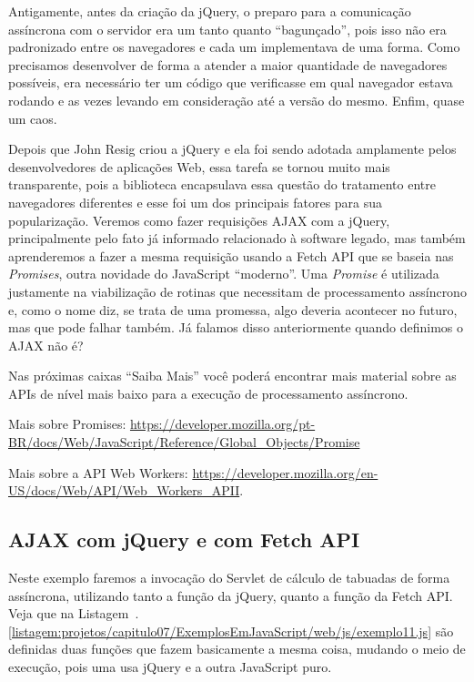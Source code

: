 Antigamente, antes da criação da jQuery, o preparo para a comunicação assíncrona com o servidor era um tanto quanto ``bagunçado'', pois isso não era padronizado entre os navegadores e cada um implementava de uma forma. Como precisamos desenvolver de forma a atender a maior quantidade de navegadores possíveis, era necessário ter um código que verificasse em qual navegador estava rodando e as vezes levando em consideração até a versão do mesmo. Enfim, quase um caos.

Depois que John Resig criou a jQuery e ela foi sendo adotada amplamente pelos desenvolvedores de aplicações Web, essa tarefa se tornou muito mais transparente, pois a biblioteca encapsulava essa questão do tratamento entre navegadores diferentes e esse foi um dos principais fatores para sua popularização. Veremos como fazer requisições AJAX com a jQuery, principalmente pelo fato já informado relacionado à software legado, mas também aprenderemos a fazer a mesma requisição usando a Fetch API que se baseia nas \textit{Promises}, outra novidade do JavaScript ``moderno''. Uma \textit{Promise} é utilizada justamente na viabilização de rotinas que necessitam de processamento assíncrono e, como o nome diz, se trata de uma promessa, algo deveria acontecer no futuro, mas que pode falhar também. Já falamos disso anteriormente quando definimos o AJAX não é?

Nas próximas caixas ``Saiba Mais'' você poderá encontrar mais material sobre as APIs de nível mais baixo para a execução de processamento assíncrono.

\begin{saibaMais}
    Mais sobre Promises: \url{https://developer.mozilla.org/pt-BR/docs/Web/JavaScript/Reference/Global_Objects/Promise}
\end{saibaMais}

\begin{saibaMais}
    Mais sobre a API Web Workers: \url{https://developer.mozilla.org/en-US/docs/Web/API/Web_Workers_APII}.
\end{saibaMais}



\subsection{AJAX com jQuery e com Fetch API}

Neste exemplo faremos a invocação do Servlet de cálculo de tabuadas de forma assíncrona, utilizando tanto a função  da jQuery, quanto a função  da Fetch API. Veja que na Listagem~\thechapter.\ref{listagem:projetos/capitulo07/ExemplosEmJavaScript/web/js/exemplo11.js} são definidas duas funções que fazem basicamente a mesma coisa, mudando o meio de execução, pois uma usa jQuery e a outra JavaScript puro.

